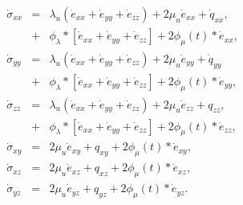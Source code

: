 \documentclass[11pt]{article}
\begin{document}
\begin{eqnarray}
  \dot{\sigma}_{xx} 
     & = & \lambda_u \left (\dot{e}_{xx} 
                 + \dot{e}_{yy} + \dot{e}_{zz}\right)
                 + 2\mu_u \dot{e}_{xx} +\dot{q}_{xx},          \nonumber\\ 
     & + & \phi_{\lambda}*[\dot{e}_{xx}+\dot{e}_{yy}
                 +\dot{e}_{zz}] + 2\phi_{\mu}(t)*\dot{e}_{xx}, \nonumber\\
  \dot{\sigma}_{yy} 
     & = & \lambda_u \left (\dot{e}_{xx} 
                 +\dot{e}_{yy} + \dot{e}_{zz}\right)
                 + 2\mu_u \dot{e}_{yy} +\dot{q}_{yy}           \nonumber\\
     & + & \phi_{\lambda}*[\dot{e}_{xx}+\dot{e}_{yy}
                 +\dot{e}_{zz}] + 2\phi_{\mu}(t)*\dot{e}_{yy}, \nonumber\\
  \dot{\sigma}_{zz} 
    & = & \lambda_u \left (\dot{e}_{xx} 
                + \dot{e}_{yy} + \dot{e}_{zz}\right)
                + 2\mu_u \dot{e}_{zz} +q_{zz},                 \nonumber\\
    & + & \phi_{\lambda}*[\dot{e}_{xx}
                +\dot{e}_{yy}+\dot{e}_{zz}] 
                + 2\phi_{\mu}(t)*\dot{e}_{zz},                 \nonumber\\
  \dot{\sigma}_{xy} 
   & = & 2\mu_u \dot{e}_{xy} +q_{xy} 
                + 2\phi_{\mu}(t)*\dot{e}_{xy},                 \nonumber\\
  \dot{\sigma}_{xz} 
   & = & 2\mu_u \dot{e}_{xz} +q_{xz} 
                + 2\phi_{\mu}(t)*\dot{e}_{xz},                 \nonumber\\
  \dot{\sigma}_{yz} 
   & = & 2\mu_u \dot{e}_{yz} +q_{yz}
               +  2\phi_{\mu}(t)*\dot{e}_{yz}.                 \nonumber\\
\end{eqnarray}

\end{document}
